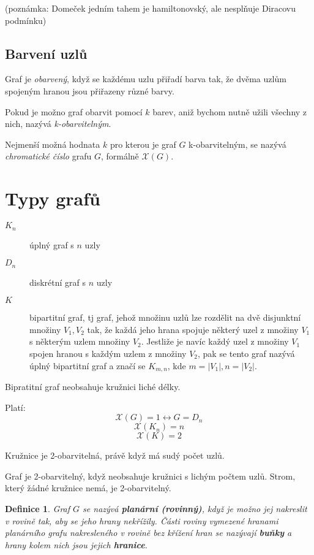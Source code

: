 \documentclass[a4paper, 11pt]{report}
\newtheorem{mydef}{Definice}[chapter]
\begin{document}
(poznámka: Domeček jedním tahem je hamiltonovský, ale nesplňuje Diracovu podmínku)

\subsection{Barvení uzlů}
Graf je \emph{obarvený}, když se každému uzlu přiřadí barva tak, že dvěma uzlům spojeným hranou jsou přiřazeny různé barvy.

Pokud je možno graf obarvit pomocí $k$ barev, aniž bychom nutně užili všechny z nich, nazývá \emph{k-obarvitelným}.

Nejmenší možná hodnata $k$ pro kterou je graf $G$ k-obarvitelným, se nazývá \emph{chromatické číslo} grafu $G$, formálně $\mathcal{X}(G)$.

\section{Typy grafů}
\begin{description}
	\item[$K_n$] úplný graf s $n$ uzly
	\item[$D_n$] diskrétní graf s $n$ uzly
	\item[$K$] bipartitní graf, tj graf, jehož množinu uzlů lze rozdělit na dvě disjunktní množiny $V_1, V_2$ tak, že každá jeho hrana spojuje některý uzel z množiny $V_1$ s některým uzlem množiny $V_2$. Jestliže je navíc každý uzel z množiny $V_1$ spojen hranou s každým uzlem z množiny $V_2$, pak se tento graf nazývá úplný bipartitní graf a značí se $K_{m,n}$, kde $m = |V_1|, n=|V_2|$.
\end{description}
Bipratitní graf neobsahuje kružnici liché délky.

Platí:
$$\mathcal{X}(G) = 1 \leftrightarrow G = D_n$$
$$\mathcal{X}(K_n) = n$$
$$\mathcal{X}(K) = 2$$

Kružnice je 2-obarvitelná, právě když má sudý počet uzlů.

Graf je 2-obarvitelný, když neobsahuje kružnici s lichým počtem uzlů.  Strom, který žádné kružnice nemá, je 2-obarvitelný.

\begin{mydef}
Graf $G$ se nazývá \textbf{planární (rovinný)}, když je možno jej nakreslit v rovině tak, aby se jeho hrany nekřížily. Části roviny vymezené hranami planárního grafu nakresleného v rovině bez křížení hran se nazývají \textbf{buňky} a hrany kolem nich jsou jejich \textbf{hranice}.
\end{mydef}
\end{document}
